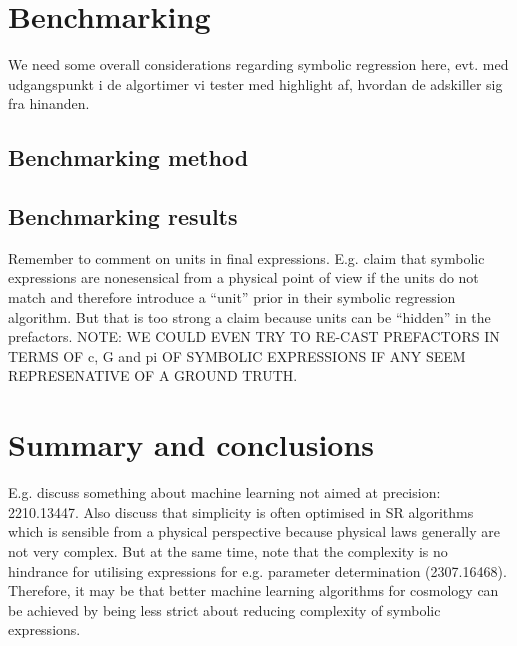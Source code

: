 \documentclass[a4paper,11pt]{article}
\begin{document}
\section{Benchmarking}\label{sec:benchmark}
We need some overall considerations regarding symbolic regression here, evt. med udgangspunkt i de algortimer vi tester med highlight af, hvordan de adskiller sig fra hinanden.

\subsection{Benchmarking method}

\subsection{Benchmarking results}
Remember to comment on units in final expressions. E.g. \cite{physics_motivation} claim that symbolic expressions are nonesensical from a physical point of view if the units do not match and therefore introduce a ``unit'' prior in their symbolic regression algorithm. But that is too strong a claim because units can be ``hidden'' in the prefactors. NOTE: WE COULD EVEN TRY TO RE-CAST PREFACTORS IN TERMS OF c, G and pi OF SYMBOLIC EXPRESSIONS IF ANY SEEM REPRESENATIVE OF A GROUND TRUTH.




\section{Summary and conclusions}\label{sec:Summary}
	E.g. discuss something about machine learning not aimed at precision: 2210.13447. Also discuss that simplicity is often optimised in SR algorithms which is sensible from a physical perspective because physical laws generally are not very complex. But at the same time, note that the complexity is no hindrance for utilising expressions for e.g. parameter determination (2307.16468). Therefore, it may be that better machine learning algorithms for cosmology can be achieved by being less strict about reducing complexity of symbolic expressions.
\end{document}
